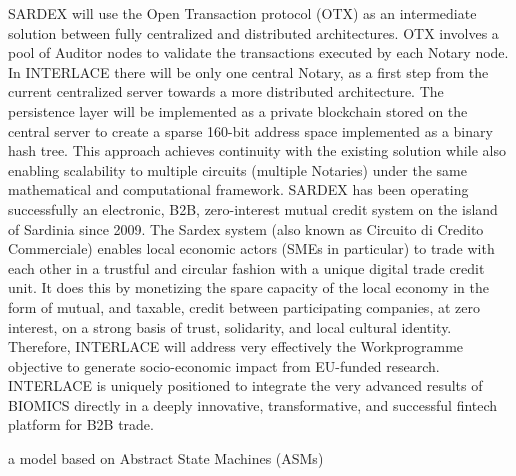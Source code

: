 SARDEX will use the Open Transaction protocol (OTX) as an intermediate solution between fully centralized and distributed architectures. OTX involves a pool of Auditor nodes to validate the transactions executed by each Notary node. In INTERLACE there will be only one central Notary, as a first step from the current centralized server towards a more distributed architecture. The persistence layer will be implemented as a private blockchain stored on the central server to create a sparse 160-bit address space implemented as a binary hash tree. This approach achieves continuity with the
existing solution while also enabling scalability to multiple circuits (multiple Notaries) under the same mathematical and computational framework. SARDEX has been operating successfully an electronic, B2B, zero-interest mutual credit system on the island of Sardinia since 2009. The Sardex system (also known as Circuito di Credito Commerciale) enables local economic actors (SMEs in particular) to trade with each other in a trustful and circular fashion with a unique digital trade credit unit. It does this by monetizing the spare capacity of the local economy in the form of mutual, and taxable, credit between participating companies, at zero interest, on a strong basis of trust, solidarity, and local cultural identity. Therefore, INTERLACE will address very effectively the Workprogramme objective to generate socio-economic impact from EU-funded research. INTERLACE is uniquely positioned to integrate the very advanced results of BIOMICS directly in a deeply innovative, transformative, and successful fintech platform for B2B trade.







\cite{BIOMICSD41,BIOMICSD42,BIOMICSD52} 

 a model based on Abstract State Machines (ASMs) \cite{BoergerStaerk2003} 









